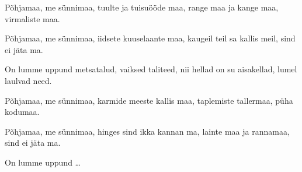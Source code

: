 P\~ohjamaa, me s\"unnimaa,
tuulte ja tuisu\"o\"ode maa,
range maa ja kange maa,
virmaliste maa.

P\~ohjamaa, me s\"unnimaa,
iidsete kuuselaante maa,
kaugeil teil sa kallis meil,
sind ei j\"ata ma.

On lumme uppund metsatalud,
vaiksed taliteed,
nii hellad on su aisakellad,
lumel laulvad need.

P\~ohjamaa, me s\"unnimaa,
karmide meeste kallis maa,
taplemiste tallermaa,
p\"uha kodumaa.

P\~ohjamaa, me s\"unnimaa,
hinges sind ikka kannan ma,
lainte maa ja rannamaa,
sind ei j\"ata ma.

On lumme uppund \ldots